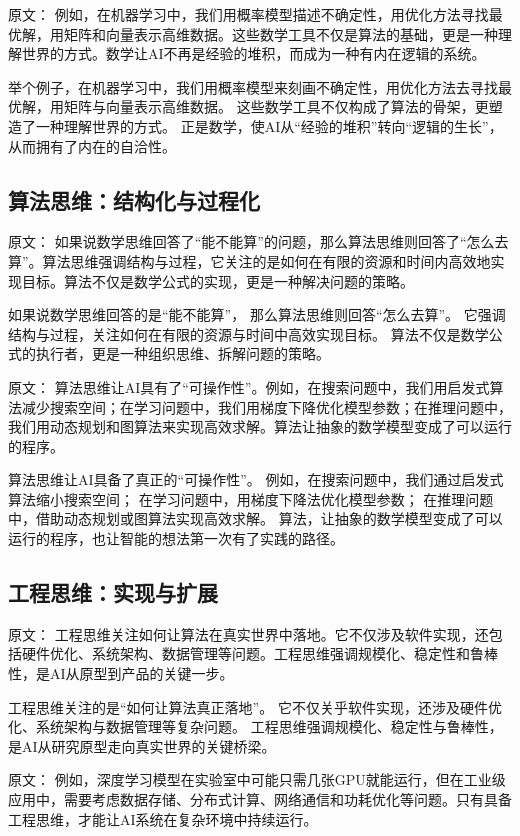原文：
例如，在机器学习中，我们用概率模型描述不确定性，用优化方法寻找最优解，用矩阵和向量表示高维数据。这些数学工具不仅是算法的基础，更是一种理解世界的方式。数学让AI不再是经验的堆积，而成为一种有内在逻辑的系统。

举个例子，在机器学习中，我们用概率模型来刻画不确定性，用优化方法去寻找最优解，用矩阵与向量表示高维数据。  
这些数学工具不仅构成了算法的骨架，更塑造了一种理解世界的方式。  
正是数学，使AI从“经验的堆积”转向“逻辑的生长”，从而拥有了内在的自洽性。

\subsection{算法思维：结构化与过程化}

原文：
如果说数学思维回答了“能不能算”的问题，那么算法思维则回答了“怎么去算”。算法思维强调结构与过程，它关注的是如何在有限的资源和时间内高效地实现目标。算法不仅是数学公式的实现，更是一种解决问题的策略。

如果说数学思维回答的是“能不能算”，  
那么算法思维则回答“怎么去算”。  
它强调结构与过程，关注如何在有限的资源与时间中高效实现目标。  
算法不仅是数学公式的执行者，更是一种组织思维、拆解问题的策略。

原文：
算法思维让AI具有了“可操作性”。例如，在搜索问题中，我们用启发式算法减少搜索空间；在学习问题中，我们用梯度下降优化模型参数；在推理问题中，我们用动态规划和图算法来实现高效求解。算法让抽象的数学模型变成了可以运行的程序。

算法思维让AI具备了真正的“可操作性”。  
例如，在搜索问题中，我们通过启发式算法缩小搜索空间；  
在学习问题中，用梯度下降法优化模型参数；  
在推理问题中，借助动态规划或图算法实现高效求解。  
算法，让抽象的数学模型变成了可以运行的程序，也让智能的想法第一次有了实践的路径。

\subsection{工程思维：实现与扩展}

原文：
工程思维关注如何让算法在真实世界中落地。它不仅涉及软件实现，还包括硬件优化、系统架构、数据管理等问题。工程思维强调规模化、稳定性和鲁棒性，是AI从原型到产品的关键一步。

工程思维关注的是“如何让算法真正落地”。  
它不仅关乎软件实现，还涉及硬件优化、系统架构与数据管理等复杂问题。  
工程思维强调规模化、稳定性与鲁棒性，是AI从研究原型走向真实世界的关键桥梁。

原文：
例如，深度学习模型在实验室中可能只需几张GPU就能运行，但在工业级应用中，需要考虑数据存储、分布式计算、网络通信和功耗优化等问题。只有具备工程思维，才能让AI系统在复杂环境中持续运行。

